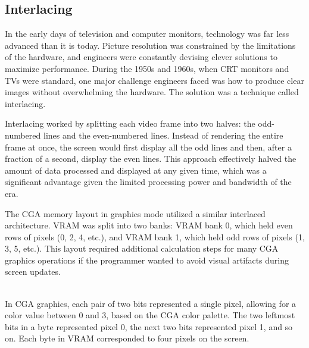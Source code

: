 \documentclass[book.tex]{subfiles}
\begin{document}
\par
\begin{minipage}{\textwidth}
  
\end{minipage}




\subsection{Interlacing}
In the early days of television and computer monitors, technology was far less advanced than it is today. Picture resolution was constrained by the limitations of the hardware, and engineers were constantly devising clever solutions to maximize performance. During the 1950s and 1960s, when CRT monitors and TVs were standard, one major challenge engineers faced was how to produce clear images without overwhelming the hardware. The solution was a technique called interlacing.\\

\par
Interlacing worked by splitting each video frame into two halves: the odd-numbered lines and the even-numbered lines. Instead of rendering the entire frame at once, the screen would first display all the odd lines and then, after a fraction of a second, display the even lines. This approach effectively halved the amount of data processed and displayed at any given time, which was a significant advantage given the limited processing power and bandwidth of the era.\\

\par
The CGA memory layout in graphics mode utilized a similar interlaced architecture. VRAM was split into two banks: VRAM bank 0, which held even rows of pixels (0, 2, 4, etc.), and VRAM bank 1, which held odd rows of pixels (1, 3, 5, etc.). This layout required additional calculation steps for many CGA graphics operations if the programmer wanted to avoid visual artifacts during screen updates.\\

\\

\par
In CGA graphics, each pair of two bits represented a single pixel, allowing for a color value between 0 and 3, based on the CGA color palette. The two leftmost bits in a byte represented pixel 0, the next two bits represented pixel 1, and so on. Each byte in VRAM corresponded to four pixels on the screen.\\
\end{document}
